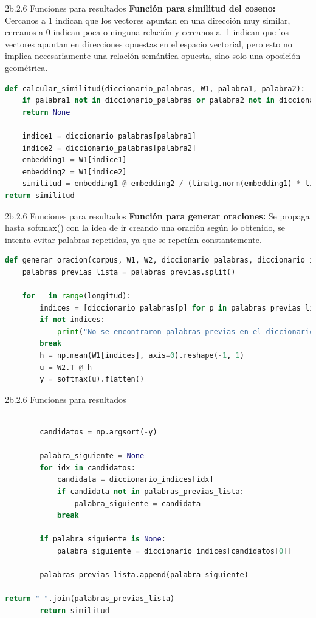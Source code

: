\documentclass{beamer}
\begin{document}
\begin{frame}[fragile]{2b.2.6 Funciones para resultados}
	\justifying
	\textbf{Función para similitud del coseno:} Cercanos a 1 indican que los vectores apuntan en una dirección muy similar, cercanos a 0 indican poca o ninguna relación y cercanos a -1 indican que los vectores apuntan en direcciones opuestas en el espacio vectorial, pero esto no implica necesariamente una relación semántica opuesta, sino solo una oposición geométrica.
		\begin{lstlisting}[language=Python]
def calcular_similitud(diccionario_palabras, W1, palabra1, palabra2):
	if palabra1 not in diccionario_palabras or palabra2 not in diccionario_palabras:
	return None
	
	indice1 = diccionario_palabras[palabra1]
	indice2 = diccionario_palabras[palabra2]
	embedding1 = W1[indice1]
	embedding2 = W1[indice2]
	similitud = embedding1 @ embedding2 / (linalg.norm(embedding1) * linalg.norm(embedding2))
return similitud
	\end{lstlisting}
\end{frame}


\begin{frame}[fragile]{2b.2.6 Funciones para resultados}
	\justifying
	\textbf{Función para generar oraciones:} Se propaga hasta softmax() con la idea de ir creando una oración según lo obtenido, se intenta evitar palabras repetidas, ya que se repetían constantemente.
	\begin{lstlisting}[language=Python]
def generar_oracion(corpus, W1, W2, diccionario_palabras, diccionario_indices, palabras_previas, longitud=10):
	palabras_previas_lista = palabras_previas.split()
	
	for _ in range(longitud):
		indices = [diccionario_palabras[p] for p in palabras_previas_lista if p in diccionario_palabras]
		if not indices:
			print("No se encontraron palabras previas en el diccionario.")
		break
		h = np.mean(W1[indices], axis=0).reshape(-1, 1)
		u = W2.T @ h
		y = softmax(u).flatten()
		\end{lstlisting}
\end{frame}


\begin{frame}[fragile]{2b.2.6 Funciones para resultados}
	\begin{lstlisting}[language=Python]

		candidatos = np.argsort(-y)
		
		palabra_siguiente = None
		for idx in candidatos:
			candidata = diccionario_indices[idx]
			if candidata not in palabras_previas_lista:
				palabra_siguiente = candidata
			break
		
		if palabra_siguiente is None:
			palabra_siguiente = diccionario_indices[candidatos[0]]
		
		palabras_previas_lista.append(palabra_siguiente)

return " ".join(palabras_previas_lista)
		return similitud
	\end{lstlisting}
\end{frame}
\end{document}
